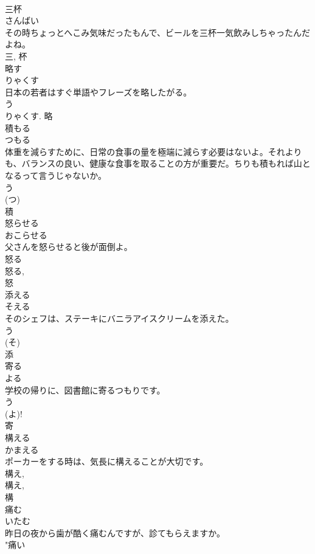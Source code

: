 \documentclass[8pt]{extreport}
\begin{document}
\begin{CJK}{UTF8}{min}
\\	三杯	
\\	さんばい	
\\	その時ちょっとへこみ気味だったもんで、ビールを三杯一気飲みしちゃったんだよね。	
\\	三, 杯	
\\	略す	
\\	りゃくす	
\\	日本の若者はすぐ単語やフレーズを略したがる。	
\\	う 
\\	りゃくす.	略	
\\	積もる	
\\	つもる	
\\	体重を減らすために、日常の食事の量を極端に減らす必要はないよ。それよりも、バランスの良い、健康な食事を取ることの方が重要だ。ちりも積もれば山となるって言うじゃないか。	
\\	う 
\\	(つ) 
\\	積	
\\	怒らせる	
\\	おこらせる	
\\	父さんを怒らせると後が面倒よ。	
\\	怒る 
\\	怒る, 
\\	怒	
\\	添える	
\\	そえる	
\\	そのシェフは、ステーキにバニラアイスクリームを添えた。	
\\	う 
\\	(そ) 
\\	添	
\\	寄る	
\\	よる	
\\	学校の帰りに、図書館に寄るつもりです。	
\\	う 
\\	(よ)! 
\\	寄	
\\	構える	
\\	かまえる	
\\	ポーカーをする時は、気長に構えることが大切です。	
\\	構え, 
\\	構え, 
\\	構	
\\	痛む	
\\	いたむ	
\\	昨日の夜から歯が酷く痛むんですが、診てもらえますか。	
\\	"痛い 

\end{CJK}
\end{document}
